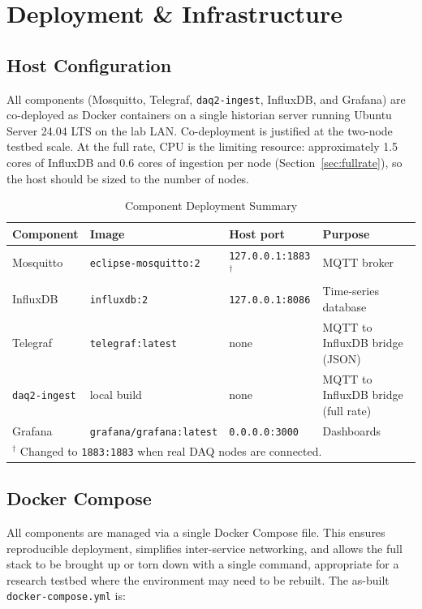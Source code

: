 \section{Deployment \& Infrastructure}

\subsection{Host Configuration}
All components (Mosquitto, Telegraf, \texttt{daq2-ingest}, InfluxDB, and Grafana) are co-deployed as Docker containers on a single historian server running Ubuntu Server 24.04 LTS on the lab LAN. Co-deployment is justified at the two-node testbed scale. At the full rate, CPU is the limiting resource: approximately 1.5 cores of InfluxDB and 0.6 cores of ingestion per node (Section~\ref{sec:fullrate}), so the host should be sized to the number of nodes.

\begin{table}[H]
\centering
\caption{Component Deployment Summary}
\begin{tabular}{llll}
\hline
\textbf{Component} & \textbf{Image} & \textbf{Host port} & \textbf{Purpose} \\
\hline
Mosquitto & \texttt{eclipse-mosquitto:2}     & \texttt{127.0.0.1:1883}$^\dagger$ & MQTT broker \\
InfluxDB  & \texttt{influxdb:2}              & \texttt{127.0.0.1:8086} & Time-series database \\
Telegraf  & \texttt{telegraf:latest}         & none                    & MQTT to InfluxDB bridge (JSON) \\
\texttt{daq2-ingest} & local build      & none                    & MQTT to InfluxDB bridge (full rate) \\
Grafana   & \texttt{grafana/grafana:latest}  & \texttt{0.0.0.0:3000}   & Dashboards \\
\hline
\multicolumn{4}{l}{\small $^\dagger$ Changed to \texttt{1883:1883} when real DAQ nodes are connected.}
\end{tabular}
\end{table}

\subsection{Docker Compose}
\label{sec:compose}
All components are managed via a single Docker Compose file. This ensures reproducible deployment, simplifies inter-service networking, and allows the full stack to be brought up or torn down with a single command, appropriate for a research testbed where the environment may need to be rebuilt. The as-built \texttt{docker-compose.yml} is:

